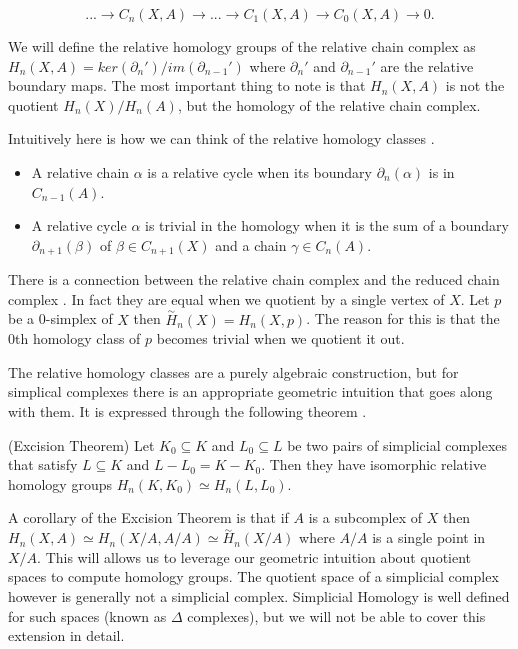 $$ ... \longrightarrow C_n(X, A) \longrightarrow ... \longrightarrow C_1(X, A) \longrightarrow C_0(X, A) \longrightarrow 0. $$

We will define the relative homology groups of the relative chain complex as $H_n(X, A) = ker(\partial_n') / im(\partial_{n-1}')$ where $\partial_n'$ and $\partial_{n-1}'$ are the relative boundary maps. The most important thing to note is that $H_n(X, A)$ is not the quotient $H_n(X) / H_n(A)$, but the homology of the relative chain complex.

Intuitively here is how we can think of the relative homology classes \cite[p. 115]{algebraic-topology}.

\begin{itemize}
  \item A relative chain $\alpha$ is a relative cycle when its boundary $\partial_n(\alpha)$ is in $C_{n-1}(A)$.
  \item A relative cycle $\alpha$ is trivial in the homology when it is the sum of a boundary $\partial_{n + 1}(\beta)$ of $\beta \in C_{n+1}(X)$ and a chain $\gamma \in C_n(A)$.
\end{itemize}

There is a connection between the relative chain complex and the reduced chain complex \cite[p. 69]{elementary-applied-topology}. In fact they are equal when we quotient by a single vertex of $X$. Let $p$ be a 0-simplex of $X$ then $\overset{\sim}{H}_n(X) = H_n(X, p)$. The reason for this is that the 0th homology class of $p$ becomes trivial when we quotient it out.

The relative homology classes are a purely algebraic construction, but for simplical complexes there is an appropriate geometric intuition that goes along with them. It is expressed through the following theorem \cite[p. 92]{comp-topo}.

\begin{thm} (Excision Theorem)
  Let $K_0 \subseteq K$ and $L_0 \subseteq L$ be two pairs of simplicial complexes that satisfy $L \subseteq K$ and $L - L_0 = K - K_0$. Then they have isomorphic relative homology groups $H_n(K, K_0) \simeq H_n(L, L_0)$.
\end{thm}

A corollary of the Excision Theorem \cite[p. 71]{elementary-applied-topology} is that if $A$ is a subcomplex of $X$ then $H_n(X, A) \simeq H_n(X/A, A/A) \simeq \overset{\sim}{H}_n(X/A)$ where $A/A$ is a single point in $X/A$. This will allows us to leverage our geometric intuition about quotient spaces to compute homology groups. The quotient space of a simplicial complex however is generally not a simplicial complex. Simplicial Homology is well defined for such spaces (known as $\Delta$ complexes), but we will not be able to cover this extension in detail.

